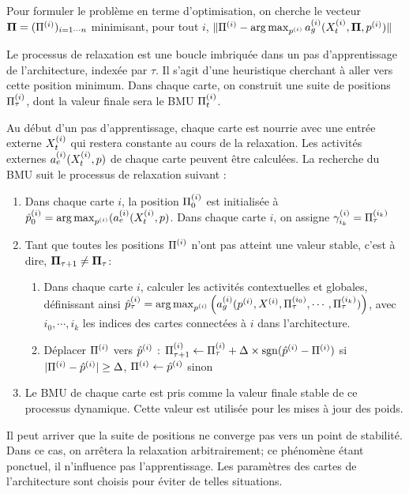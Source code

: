 \documentclass[../main]{subfiles}
\begin{document}
Pour formuler le problème en terme d'optimisation, on cherche le vecteur $\mathbf{\Pi} = (\Pi^{({i})})_{i=1 \cdots n}$ minimisant, pour tout $i$, $\lVert \Pi^{({i})} - \operatorname*{arg\,max}_{p^{({i})}} a_g^{({i})}(X^{({i})}_t, \mathbf{\Pi}, p^{({i})}) \rVert$

Le processus de relaxation est une boucle imbriquée dans un pas d'apprentissage de l'architecture, indexée par $\tau$. Il s'agit d'une heuristique cherchant à aller vers cette position minimum. Dans chaque carte, on construit une suite de positions $\Pi^{({i})}_\tau$, dont la valeur finale sera le BMU $\Pi^{({i})}_t$.

Au début d'un pas d'apprentissage, chaque carte est nourrie avec une entrée externe $X^{({i})}_t$ qui restera constante au cours de la relaxation. Les activités externes $a_e^{({i})}(X^{({i})}_t,p)$ de chaque carte peuvent être calculées.
La recherche du BMU suit le processus de relaxation suivant :
\begin{enumerate}
\item Dans chaque carte $i$, la position $\Pi^{({i})}_0$ est initialisée à $\hat{p}^{({i})}_0 = \operatorname*{arg\,max}_{p^{({i})}}(a_e^{({i})}(X^{({i})}_t,p)$. Dans chaque carte $i$, on assigne $\gamma_{i_k}^{({i})} = \Pi^{({i_k})}_\tau$
\item Tant que toutes les positions $\Pi^{({i})}$ n'ont pas atteint une valeur stable, c'est à dire, $\mathbf{\Pi}_{\tau+1} \neq \mathbf{\Pi}_\tau$:
	\begin{enumerate}
	\item Dans chaque carte $i$, calculer les activités contextuelles et globales, définissant ainsi $\hat{p}^{({i})}_\tau = \operatorname*{arg\,max}_{p^{({i})}} \left(a_g^{({i})}(p^{({i})},X^{({i})}, \Pi^{({i_0})}_\tau,\cdots,\Pi^{({i_k})}_\tau)\right)$, avec $i_0, \cdots, i_k$ les indices des cartes connectées à $i$ dans l'architecture.
	\item Déplacer $\Pi^{({i})}$ vers $\hat{p}^{({i})}$ : $\Pi^{({i})}_{\tau +1} \leftarrow \Pi^{({i})}_\tau + \Delta \times \operatorname{sgn}(\hat{p}^{({i})} - \Pi^{({i})})$ si $\lvert \Pi^{({i})}- \hat{p}^{({i})}\rvert \geq \Delta$, $\Pi^{({i})} \leftarrow \hat{p}^{({i})}$ sinon
	\end{enumerate}
\item Le BMU de chaque carte est pris comme la valeur finale stable de ce processus dynamique. Cette valeur est utilisée pour les mises à jour des poids.
\end{enumerate}

Il peut arriver que la suite de positions ne converge pas vers un point de stabilité. Dans ce cas, on arrêtera la relaxation arbitrairement; ce phénomène étant ponctuel, il n'influence pas l'apprentissage. Les paramètres des cartes de l'architecture sont choisis pour éviter de telles situations. 
\end{document}
